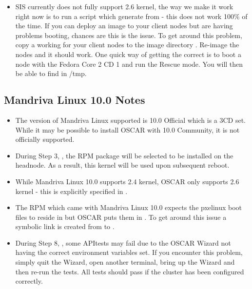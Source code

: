 \begin{itemize}

\item SIS currently does not fully support 2.6 kernel, the way we make it
  work right now is to run a script which generate 
  from  - this does not work 100\% of the time.  If
  you can deploy an image to your client nodes but are having problems
  booting, chances are this is the issue.  To get around this problem, copy a
  working  for your client nodes to the image directory
  .  Re-image the
  nodes and it should work.  One quick way of getting the correct
   is to boot a node with the Fedora Core 2 CD 1
  and run the Rescue mode.  You will then be able to find
   in \-/tmp.

\end{itemize}


\subsection{Mandriva Linux 10.0 Notes}
\label{subsec:mdk10notes}

\begin{itemize}

\item The version of Mandriva Linux supported is 10.0 Official which is a
3CD set.  While it may be possible to install OSCAR with 10.0 Community,
it is not officially supported.

\item During Step 3, , the RPM package
 will be selected to be installed on the headnode.
As a result, this kernel will be used upon subsequent reboot.

\item While Mandriva Linux 10.0 supports 2.4 kernel, OSCAR only supports
2.6 kernel - this is explicitly specified in
.

\item The  RPM which came with Mandriva Linux 10.0 expects the
pxelinux boot files to reside in  but OSCAR puts
them in .  To get around this issue a symbolic link is
created from  to .

\item During Step 8, , some APItests may fail due to
the OSCAR Wizard not having the correct environment variables set.  If you
encounter this problem, simply quit the Wizard, open another terminal,
bring up the Wizard and then re-run the tests.  All tests should pass if
the cluster has been configured correctly.

\end{itemize}
